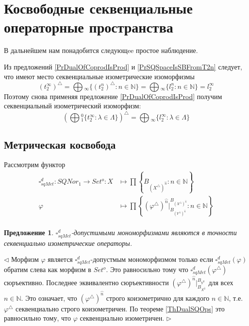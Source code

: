 \documentclass[12pt]{article}
\newtheorem{proposition}[theorem]{Предложение}
\newenvironment{proof}{\par $\triangleleft$}{$\triangleright$}
\begin{document}
\section{Косвободные секвенциальные операторные пространства}


В дальнейшем нам понадобится следующee простое наблюдение.

Из предложений \ref{PrDualOfCoprodIsProd} и \ref{PrSQSpaceIsSBFromT2n} следует, что имеют место секвенциальные изометрические изоморфизмы
$$
(t_2^\infty)^\triangle
=\bigoplus{}_\infty\{(t_2^n)^\triangle:n\in\mathbb{N}\}
=\bigoplus{}_\infty\{l_2^n:n\in\mathbb{N}\}
=l_2^\infty
$$
Поэтому снова применяя предложение \ref{PrDualOfCoprodIsProd} получим секвенциальный изометрический изоморфизм:
$$
\left(\bigoplus{}_1^0\{t_2^\infty:\lambda\in\Lambda\}\right)^\triangle
=\bigoplus{}_\infty\{l_2^\infty:\lambda\in\Lambda\}
$$
 
\subsection{Метрическая косвобода}

Рассмотрим функтор 
$$
\begin{aligned}
\square_{sqMet}^d : SQNor_1 \to Set^o: X &\mapsto \prod \left\{B_{(X^\triangle )^{\wideparen{n}}}:n\in\mathbb{N}\right\}\\
\varphi&\mapsto\prod\left\{ (\varphi^\triangle )^{\wideparen{n}}|_{B_{(Y^\triangle )^{\wideparen{n}}}}^{B_{(X^\triangle )^{\wideparen{n}}}}:n\in\mathbb{N}\right\}\\
\end{aligned}
$$
\begin{proposition}\label{PrDecsMetrAdmMonoMorph}
$\square_{sqMet}^d$-допустимыми мономорфизмами являются в точности секвенциально  изометрические операторы.
\end{proposition}
\begin{proof}
Морфизм $\varphi$ является $\square_{sqMet}^d$-допустмым мономорфизмом только если $\square_{sqMet}^d(\varphi)$ обратим слева как морфизм в $Set^o$. Это равносильно тому что 
$\square_{sqMet}^d(\varphi^\triangle)$ сюръективно. Последнее эквивалентно  сюръективности $(\varphi^\triangle)^{\wideparen{n}}|_{B_{X^{\wideparen{n}}}}^{B_{Y^{\wideparen{n}}}}$ 
для всех $n\in\mathbb{N}$. Это означает, что $(\varphi^\triangle)^{\wideparen{n}}$ строго коизометрично для каждого $n\in\mathbb{N}$, т.е. $\varphi^\triangle$ секвенциально строго коизометричен. 
По теореме \ref{ThDualSQOps} это равносильно тому, что $\varphi$ секвенциально изометричен.
\end{proof}
\end{document}
